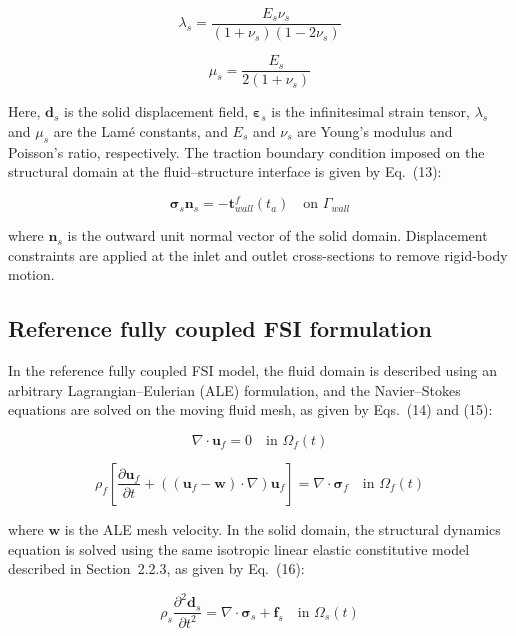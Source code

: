 \documentclass[master,english,final]{kaist-ucs}
\begin{document}
\begin{equation}
\lambda_s = \frac{E_s\nu_s}{(1 + \nu_s)(1 - 2\nu_s)}
\end{equation}

\begin{equation}
\mu_s = \frac{E_s}{2(1 + \nu_s)}
\end{equation}

Here, $\mathbf{d}_s$ is the solid displacement field, $\boldsymbol{\varepsilon}_s$ is the infinitesimal strain tensor, $\lambda_s$ and $\mu_s$ are the Lam\'e constants, and $E_s$ and $\nu_s$ are Young's modulus and Poisson's ratio, respectively. The traction boundary condition imposed on the structural domain at the fluid--structure interface is given by Eq.~(13):

\begin{equation}
\boldsymbol{\sigma}_s \mathbf{n}_s = -\mathbf{t}_{wall}^{f}(t_a) \quad \text{on } \Gamma_{wall}
\end{equation}

where $\mathbf{n}_s$ is the outward unit normal vector of the solid domain. Displacement constraints are applied at the inlet and outlet cross-sections to remove rigid-body motion.

\subsection{Reference fully coupled FSI formulation}
In the reference fully coupled FSI model, the fluid domain is described using an arbitrary Lagrangian--Eulerian (ALE) formulation, and the Navier--Stokes equations are solved on the moving fluid mesh, as given by Eqs.~(14) and (15):

\begin{equation}
\nabla \cdot \mathbf{u}_f = 0 \quad \text{in } \Omega_f(t)
\end{equation}

\begin{equation}
\rho_f \left[\frac{\partial \mathbf{u}_f}{\partial t} + \left((\mathbf{u}_f - \mathbf{w}) \cdot \nabla\right)\mathbf{u}_f\right] = \nabla \cdot \boldsymbol{\sigma}_f \quad \text{in } \Omega_f(t)
\end{equation}

where $\mathbf{w}$ is the ALE mesh velocity. In the solid domain, the structural dynamics equation is solved using the same isotropic linear elastic constitutive model described in Section~2.2.3, as given by Eq.~(16):

\begin{equation}
\rho_s \frac{\partial^2 \mathbf{d}_s}{\partial t^2} = \nabla \cdot \boldsymbol{\sigma}_s + \mathbf{f}_s \quad \text{in } \Omega_s(t)
\end{equation}
\end{document}
